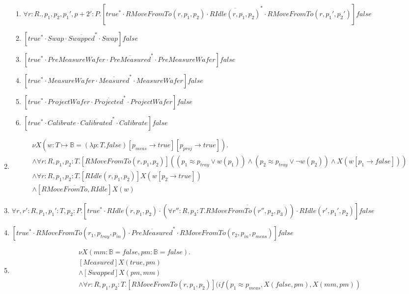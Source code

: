 \begin{enumerate}
\begin{enumerate}
        \item $\forall r:R., p_1,p_2,p_1',p+2':P.[true^{*}\cdot RMoveFromTo(r, p_1, p_2) \cdot \overline{RIdle(r, p_1, p_2)}^{*} \cdot RMoveFromTo(r, p_1', p_2')]false$
        \item $[true^{*}\cdot Swap \cdot \overline{Swapped}^{*} \cdot Swap]false$
        \item $[true^{*}\cdot PreMeasureWafer \cdot \overline{PreMeasured}^{*} \cdot PreMeasureWafer]false$
        \item $[true^{*}\cdot MeasureWafer \cdot \overline{Measured}^{*} \cdot MeasureWafer]false$
        \item $[true^{*}\cdot ProjectWafer \cdot \overline{Projected}^{*} \cdot ProjectWafer]false$
        \item $[true^{*}\cdot Calibrate \cdot \overline{Calibrated}^{*} \cdot Calibrate]false$
    \end{enumerate}
        \item \begin{align*}
            &\nu X(w:T\mapsto \mathbb{B} = (\lambda p:T.false)[p_\mathit{meas} \rightarrow true][p_\mathit{proj} \rightarrow true]). \\
            &\wedge \forall r:R, p_1,p_2 :T.[RMoveFromTo(r, p_1,p_2)]((p_1 \approx p_\textit{tray} \vee w(p_1)) \wedge (p_2 \approx p_\textit{tray} \vee \lnot w(p_2)) \wedge X(w[p_1\rightarrow false]))\\
            &\wedge \forall r:R, p_1,p_2 :T.[RIdle(r, p_1,p_2)]X(w[p_2\rightarrow true])\\
            &\wedge [\overline{RMoveFromTo, RIdle}]X(w)
        \end{align*}
    \item $\forall r,r' :R, p_1,p_1' : T, p_2:P.[true^{*}\cdot RIdle(r, p_1, p_2) \cdot 	(\forall r'':R, p_3:T. \overline{RMoveFromTo(r'', p_2, p_3)})\cdot RIdle(r', p_1', p_2)]false$
    \item $[true^{*}\cdot RMoveFromTo(r_1, p_\mathit{tray}, p_\mathit{in}) \cdot \overline{PreMeasured}^{*} \cdot RMoveFromTo(r_2, p_\mathit{in}, p_\mathit{meas})]false$
    \item \begin{align*}
    	&\nu X(mm:\mathbb{B} = false, pm:\mathbb{B}=false).\\
    	&[Measured]X(true, pm)\\
    	&\wedge [Swapped]X(pm, mm)\\
    	&\wedge \forall r:R, p_1, p_2:T.[RMoveFromTo(r, p_1, p_2)](if(p_1 \approx p_\mathit{meas}, X(false, pm), X(mm, pm))\\

\end{align*}
\end{enumerate}
